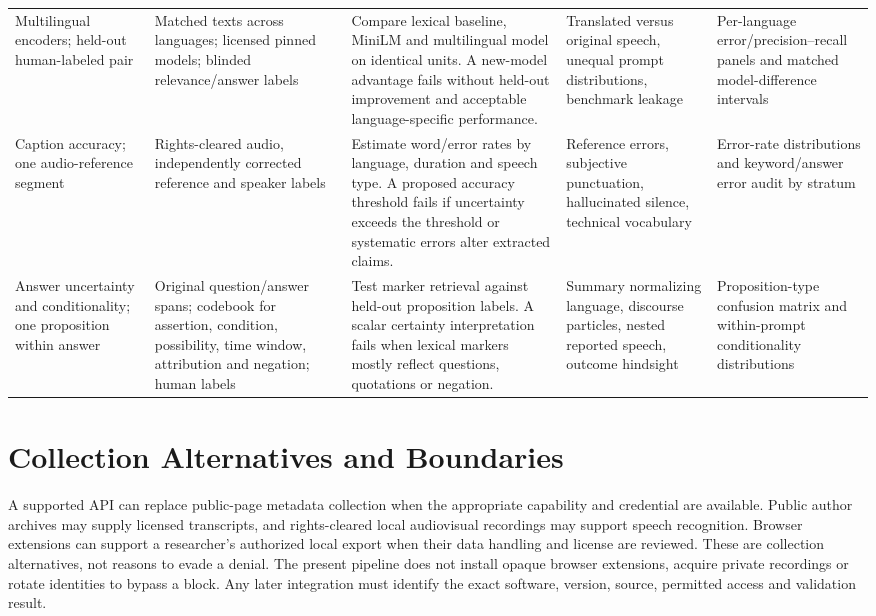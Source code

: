 \begin{longtable}{p{}p{}p{}p{}p{}}
Multilingual encoders; held-out human-labeled pair & Matched texts across languages; licensed pinned models; blinded relevance/answer labels & Compare lexical baseline, MiniLM and multilingual model on identical units. A new-model advantage fails without held-out improvement and acceptable language-specific performance. & Translated versus original speech, unequal prompt distributions, benchmark leakage & Per-language error/precision--recall panels and matched model-difference intervals \\
Caption accuracy; one audio-reference segment & Rights-cleared audio, independently corrected reference and speaker labels & Estimate word/error rates by language, duration and speech type. A proposed accuracy threshold fails if uncertainty exceeds the threshold or systematic errors alter extracted claims. & Reference errors, subjective punctuation, hallucinated silence, technical vocabulary & Error-rate distributions and keyword/answer error audit by stratum \\
Answer uncertainty and conditionality; one proposition within answer & Original question/answer spans; codebook for assertion, condition, possibility, time window, attribution and negation; human labels & Test marker retrieval against held-out proposition labels. A scalar certainty interpretation fails when lexical markers mostly reflect questions, quotations or negation. & Summary normalizing language, discourse particles, nested reported speech, outcome hindsight & Proposition-type confusion matrix and within-prompt conditionality distributions \\
\bottomrule
\end{longtable}
\endgroup

\section{Collection Alternatives and Boundaries}
A supported API can replace public-page metadata collection when the appropriate capability and credential are available. Public author archives may supply licensed transcripts, and rights-cleared local audiovisual recordings may support speech recognition. Browser extensions can support a researcher's authorized local export when their data handling and license are reviewed. These are collection alternatives, not reasons to evade a denial. The present pipeline does not install opaque browser extensions, acquire private recordings or rotate identities to bypass a block. Any later integration must identify the exact software, version, source, permitted access and validation result.

